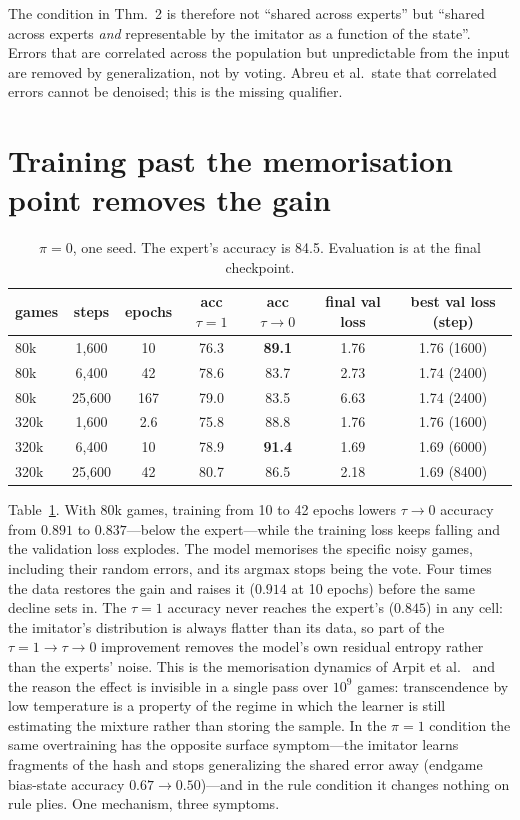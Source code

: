 \documentclass[11pt]{article}
\newcommand{\tauz}{\tau\!\to\!0}
\begin{document}
The condition in Thm.~2 is therefore not ``shared across experts'' but ``shared across experts \emph{and} representable by the imitator as a function of the state''. Errors that are correlated across the population but unpredictable from the input are removed by generalization, not by voting. Abreu et al.\ state that correlated errors cannot be denoised; this is the missing qualifier.

\section{Training past the memorisation point removes the gain}\label{sec:regime}

\begin{table}[t]
\centering\small
\begin{tabular}{lcccccc}
\toprule
games & steps & epochs & acc $\tau{=}1$ & acc $\tauz$ & final val loss & best val loss (step) \\
\midrule
80k  & 1{,}600  & 10  & 76.3 & \textbf{89.1} & 1.76 & 1.76 (1600) \\
80k  & 6{,}400  & 42  & 78.6 & 83.7 & 2.73 & 1.74 (2400) \\
80k  & 25{,}600 & 167 & 79.0 & 83.5 & 6.63 & 1.74 (2400) \\
320k & 1{,}600  & 2.6 & 75.8 & 88.8 & 1.76 & 1.76 (1600) \\
320k & 6{,}400  & 10  & 78.9 & \textbf{91.4} & 1.69 & 1.69 (6000) \\
320k & 25{,}600 & 42  & 80.7 & 86.5 & 2.18 & 1.69 (8400) \\
\bottomrule
\end{tabular}
\caption{$\pi=0$, one seed. The expert's accuracy is 84.5. Evaluation is at the final checkpoint.}
\label{tab:regime}
\end{table}

Table~\ref{tab:regime}. With 80k games, training from 10 to 42 epochs lowers $\tauz$ accuracy from $0.891$ to $0.837$---below the expert---while the training loss keeps falling and the validation loss explodes. The model memorises the specific noisy games, including their random errors, and its argmax stops being the vote. Four times the data restores the gain and raises it ($0.914$ at 10 epochs) before the same decline sets in. The $\tau=1$ accuracy never reaches the expert's ($0.845$) in any cell: the imitator's distribution is always flatter than its data, so part of the $\tau=1\to\tauz$ improvement removes the model's own residual entropy rather than the experts' noise. This is the memorisation dynamics of Arpit et al.~\cite{arpit2017} and the reason the effect is invisible in a single pass over $10^9$ games: transcendence by low temperature is a property of the regime in which the learner is still estimating the mixture rather than storing the sample. In the $\pi=1$ condition the same overtraining has the opposite surface symptom---the imitator learns fragments of the hash and stops generalizing the shared error away (endgame bias-state accuracy $0.67\to0.50$)---and in the rule condition it changes nothing on rule plies. One mechanism, three symptoms.
\end{document}
